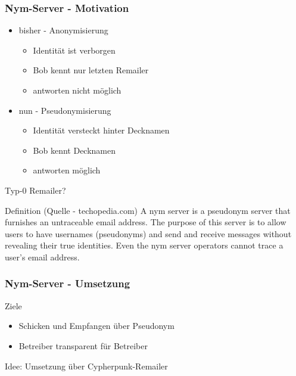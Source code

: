 \documentclass{beamer}
\begin{document}
\begin{frame}
	\frametitle{Nym-Server - Motivation}
	\begin{itemize}
		\item bisher - Anonymisierung
		\begin{itemize}	
			\item Identität ist verborgen
			\item Bob kennt nur letzten Remailer
			\item antworten nicht möglich
		\end{itemize}
		\pause
		\item nun - Pseudonymisierung
		\begin{itemize}	
			\item Identität versteckt hinter Decknamen
			\item Bob kennt Decknamen
			\item antworten möglich
		\end{itemize}
	\end{itemize}

	\pause
	Typ-0 Remailer?
	\pause

	\begin{block}{Definition (Quelle - techopedia.com)}
		A nym server is a pseudonym server that furnishes an untraceable email address. The purpose of this server is to allow users to have usernames (pseudonyms) and send and 			receive messages without revealing their true identities.
		Even the nym server operators cannot trace a user's email address.
	\end{block}
\end{frame}

\begin{frame}
	\frametitle{Nym-Server - Umsetzung}

	\begin{block}{Ziele}
		\begin{itemize}
			\item Schicken und Empfangen über Pseudonym
			\item Betreiber transparent für Betreiber
		\end{itemize}
	\end{block}

	\pause

	Idee: Umsetzung über Cypherpunk-Remailer
	
\end{frame}
\end{document}
